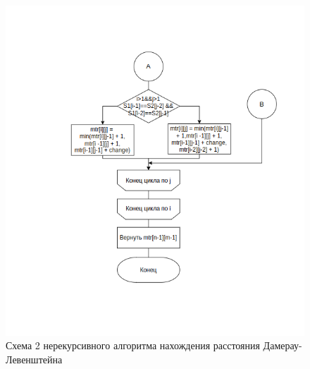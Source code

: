 \begin{figure}[h]
	\centering
	\includegraphics[width=\textwidth]{img/dliter2.png}
	\caption{Схема 2 нерекурсивного алгоритма нахождения расстояния Дамерау-Левенштейна}
	\label{fig:DLiter2}
\end{figure}

\clearpage

